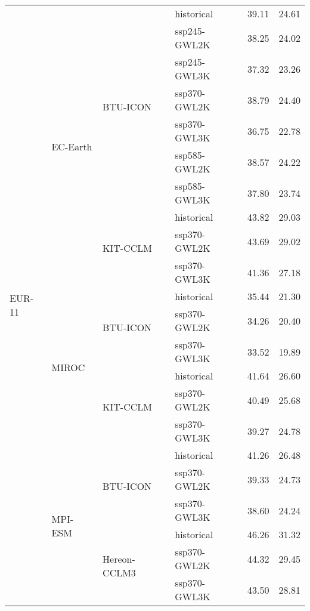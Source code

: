 \begin{table}[!htbp]
\begin{tabular}{lll|l|cc}
\midrule
\multirow{22}{*}{EUR-11} & \multirow{10}{*}{EC-Earth} & \multirow{7}{*}{BTU-ICON} & historical & 39.11 & 24.61 \\
 &  &  & ssp245-GWL2K & 38.25 & 24.02 \\
 &  &  & ssp245-GWL3K & 37.32 & 23.26 \\
 &  &  & ssp370-GWL2K & 38.79 & 24.40 \\
 &  &  & ssp370-GWL3K & 36.75 & 22.78 \\
 &  &  & ssp585-GWL2K & 38.57 & 24.22 \\
 &  &  & ssp585-GWL3K & 37.80 & 23.74 \\
\cmidrule(lr){3-6}
 &  & \multirow{3}{*}{KIT-CCLM} & historical & 43.82 & 29.03 \\
 &  &  & ssp370-GWL2K & 43.69 & 29.02 \\
 &  &  & ssp370-GWL3K & 41.36 & 27.18 \\
\cmidrule(lr){3-6}
\cmidrule(lr){2-6}
 & \multirow{6}{*}{MIROC} & \multirow{3}{*}{BTU-ICON} & historical & 35.44 & 21.30 \\
 &  &  & ssp370-GWL2K & 34.26 & 20.40 \\
 &  &  & ssp370-GWL3K & 33.52 & 19.89 \\
\cmidrule(lr){3-6}
 &  & \multirow{3}{*}{KIT-CCLM} & historical & 41.64 & 26.60 \\
 &  &  & ssp370-GWL2K & 40.49 & 25.68 \\
 &  &  & ssp370-GWL3K & 39.27 & 24.78 \\
\cmidrule(lr){3-6}
\cmidrule(lr){2-6}
 & \multirow{6}{*}{MPI-ESM} & \multirow{3}{*}{BTU-ICON} & historical & 41.26 & 26.48 \\
 &  &  & ssp370-GWL2K & 39.33 & 24.73 \\
 &  &  & ssp370-GWL3K & 38.60 & 24.24 \\
\cmidrule(lr){3-6}
 &  & \multirow{3}{*}{Hereon-CCLM3} & historical & 46.26 & 31.32 \\
 &  &  & ssp370-GWL2K & 44.32 & 29.45 \\
 &  &  & ssp370-GWL3K & 43.50 & 28.81 \\
\bottomrule
\end{tabular}
\end{table}
